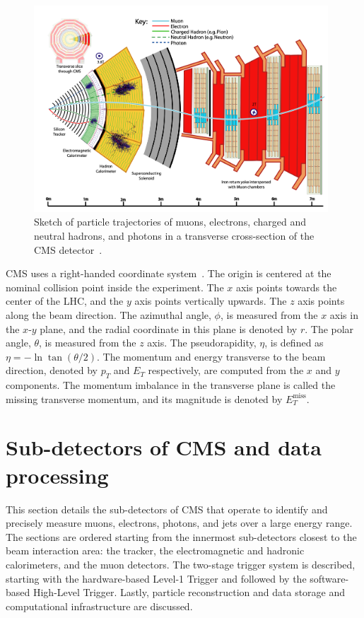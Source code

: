 \begin{figure}[ht]
    \centering
    \includegraphics[width=11cm]{figures/ch-2-cern-cms/sketch-cms-particle-interactions.png}
    \caption[Sketch of particle trajectories of muons, electrons, charged and neutral hadrons, and photons in a transverse cross-section of the CMS detector.]{Sketch of particle trajectories of muons, electrons, charged and neutral hadrons, and photons in a transverse cross-section of the CMS detector~\cite{CERN-EP-2017-110}.}
    \label{fig:sketch-cms-particle-interactions}
\end{figure}

CMS uses a right-handed coordinate system~\cite{CMS-2008-JINST-3-S08004}. The origin is centered at the nominal collision point inside the experiment. The $x$ axis points towards the center of the LHC, and the $y$ axis points vertically upwards. The $z$ axis points along the beam direction. The azimuthal angle, $\phi$, is measured from the $x$ axis in the $x$-$y$ plane, and the radial coordinate in this plane is denoted by $r$. The polar angle, $\theta$, is measured from the $z$ axis. The pseudorapidity, $\eta$, is defined as $\eta = -\ln \tan(\theta/2)$. The momentum and energy transverse to the beam direction, denoted by $p_{T}$ and $E_{T}$ respectively, are computed from the $x$ and $y$ components. The momentum imbalance in the transverse plane is called the missing transverse momentum, and its magnitude is denoted by $E_{T}^{\text{miss}}$.

\section{Sub-detectors of CMS and data processing}
This section details the sub-detectors of CMS that operate to identify and precisely measure muons, electrons, photons, and jets over a large energy range. The sections are ordered starting from the innermost sub-detectors closest to the beam interaction area: the tracker, the electromagnetic and hadronic calorimeters, and the muon detectors. The two-stage trigger system is described, starting with the hardware-based Level-1 Trigger and followed by the software-based High-Level Trigger. Lastly, particle reconstruction and data storage and computational infrastructure are discussed.

